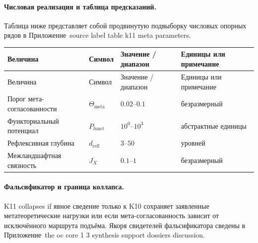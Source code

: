 \paragraph{Числовая реализация и таблица предсказаний.}
Таблица ниже представляет собой продвинутую подвыборку числовых опорных рядов в Приложение~source label table k11 meta parameters.
\begin{longtable}{@{}L{0.27\textwidth}L{0.15\textwidth}L{0.24\textwidth}L{0.16\textwidth}@{}}
\toprule
Величина & Символ & Значение / диапазон & Единицы или примечание \\
\midrule
\endfirsthead
\toprule
Величина & Символ & Значение / диапазон & Единицы или примечание \\
\midrule
\endhead
Порог мета-согласованности & $\scriptstyle \Theta_{\mathrm{meta}}$ & $0.02\text{--}0.1$ & безразмерный \\
Функториальный потенциал & $\scriptstyle P_{\mathrm{funct}}$ & $10^0\text{--}10^3$ & абстрактные единицы \\
Рефлексивная глубина & $\scriptstyle d_{\mathrm{refl}}$ & $3\text{--}50$ & уровней \\
Межландшафтная связность & $\scriptstyle J_X$ & $0.1\text{--}1$ & безразмерный \\
\bottomrule
\end{longtable}

\paragraph{Фальсификатор и граница коллапса.}
K11 collapses if явное сведение только к K10 сохраняет заявленные метатеоретические нагрузки или если мета-согласованность зависит от исключённого маршрута подъёма.
Якоря свидетелей фальсификатора сведены в Приложение~the oc core 1 3 synthesis support dossiers discussion.


